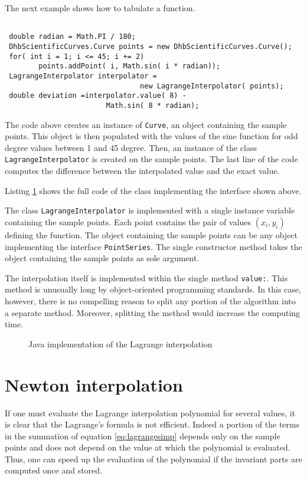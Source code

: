 \documentclass[twoside]{book}
\begin{document}
The next example shows how to tabulate a function.
\begin{codeExample} \label{ex:lagrangeJ2}
\begin{verbatim}

 double radian = Math.PI / 180;
 DhbScientificCurves.Curve points = new DhbScientificCurves.Curve();
 for( int i = 1; i <= 45; i += 2)
        points.addPoint( i, Math.sin( i * radian));
 LagrangeInterpolator interpolator =
                                new LagrangeInterpolator( points);
 double deviation =interpolator.value( 8) -
                        Math.sin( 8 * radian);
\end{verbatim}
\end{codeExample}
The code above creates an instance of {\tt Curve}, an object
containing the sample points. This object is then populated with
the values of the sine function for odd degree values between 1
and 45 degree. Then, an instance of the class {\tt
LagrangeInterpolator} is created on the sample points. The last
line of the code computes the difference between the interpolated
value and the exact value.

Listing \ref{lj:lagrange} shows the full code of the class
implementing the interface shown above.

The class {\tt LagrangeInterpolator} is implemented with a single
instance variable containing the sample points. Each point
contains the pair of values $\left(x_i,y_i\right)$ defining the
function. The object containing the sample points can be any
object implementing the interface {\tt PointSeries}. The single
constructor method takes the object containing the sample points
as sole argument.

The interpolation itself is implemented within the single method
{\tt value:}. This method is unusually long by object-oriented
programming standards. In this case, however, there is no
compelling reason to split any portion of the algorithm into a
separate method. Moreover, splitting the method would increase the
computing time.
\begin{figure}\begin{listing} \caption{Java implementation of the Lagrange
interpolation}
\label{lj:lagrange}

\end{listing}\end{figure}

\section{Newton interpolation}
\label{sec:newtoninterpol} If one must evaluate the Lagrange
interpolation polynomial for several values, it is clear that the
Lagrange's formula is not efficient. Indeed a portion of the terms
in the summation of equation \ref{eq:lagrangesimp} depends only on
the sample points and does not depend on the value at which the
polynomial is evaluated. Thus, one can speed up the evaluation of
the polynomial if the invariant parts are computed once and
stored.
\end{document}
